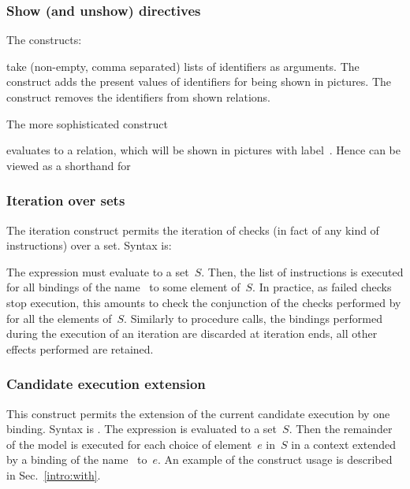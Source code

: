 \subsubsection*{Show (and unshow) directives}
\label{show:def}The constructs:
\begin{center}
\quad{}
\end{center}
take (non-empty, comma separated) lists of identifiers as arguments.
The  construct adds the present values of identifiers for being
shown in pictures.
The  construct removes the identifiers from shown relations.

The more sophisticated construct
\begin{center}\end{center}
evaluates  to a relation, which will be shown in pictures with
label~.
Hence   can be viewed as a shorthand
for 

\subsubsection*{Iteration over sets}
The  iteration construct
permits the iteration of checks (in fact of any kind of instructions)
over a set. Syntax is:
\begin{center}
      
\end{center}
The expression  must evaluate to a set~$S$.
Then, the list of instructions  is executed
for all bindings of the name~ to some element of~$S$.
In practice, as failed checks stop execution, this amounts
to check the conjunction of the checks performed by 
for all the elements of~$S$.
Similarly to procedure calls,
the bindings performed during the execution of an iteration
are discarded at iteration ends, all other effects performed are
retained.

\subsubsection*{Candidate execution extension}
This construct permits the extension of the current candidate
execution by one binding.
Syntax is .
The expression  is evaluated to a set~$S$.
Then the remainder of the model is executed for each choice
of element~$e$ in~$S$ in a context extended by a binding
of the name~ to~$e$.
An example of the construct usage is described in Sec.~\ref{intro:with}.

